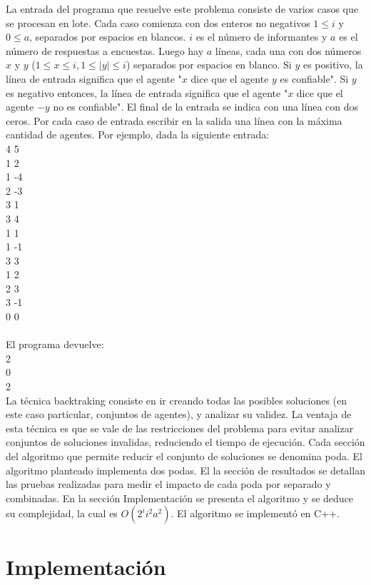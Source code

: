 \documentclass{article}
\begin{document}
La entrada del programa que resuelve este problema consiste de varios casos que se procesan en lote. Cada caso comienza con dos enteros no negativos $1 \leq i$ y $0 \leq a$, separados por espacios en blancos. $i$ es el número de informantes y $a$ es el número de respuestas a encuestas. Luego hay $a$ líneas, cada una con dos números $x$ y $y$ ($1 \leq x \leq i, 1 \leq |y| \leq i$) separados por espacios en blanco. Si $y$ es positivo, la línea de entrada significa que el agente "$x$ dice que el agente $y$ es confiable". Si $y$ es negativo entonces, la línea de entrada significa que el agente "$x$ dice que el agente $-y$ no es confiable". El final de la entrada se indica con una línea con dos ceros. Por cada caso de entrada escribir en la salida una línea con la máxima cantidad de agentes. Por ejemplo, dada la siguiente entrada: \\
4 5 \\
1 2 \\
1 -4 \\
2 -3 \\
3 1 \\
3 4 \\
1 1 \\
1 -1 \\
3 3 \\
1 2 \\
2 3 \\
3 -1 \\
0 0 \\ \\
El programa devuelve: \\
2 \\
0 \\
2 \\

La técnica backtraking consiste en ir creando todas las posibles soluciones (en este caso particular, conjuntos de agentes), y analizar su validez. La ventaja de esta técnica es que se vale de las restricciones del problema para evitar analizar conjuntos de soluciones invalidas, reduciendo el tiempo de ejecución. Cada sección del algoritmo que permite reducir el conjunto de soluciones se denomina poda. El algoritmo planteado implementa dos podas. El la sección de resultados se detallan las pruebas realizadas para medir el impacto de cada poda por separado y combinadas.
En la sección Implementación se presenta el algoritmo y se deduce su complejidad, la cual es $O(2^i i^2 a^2) $.
 El algoritmo se implementó en C++. 

\section{Implementación}
\end{document}
